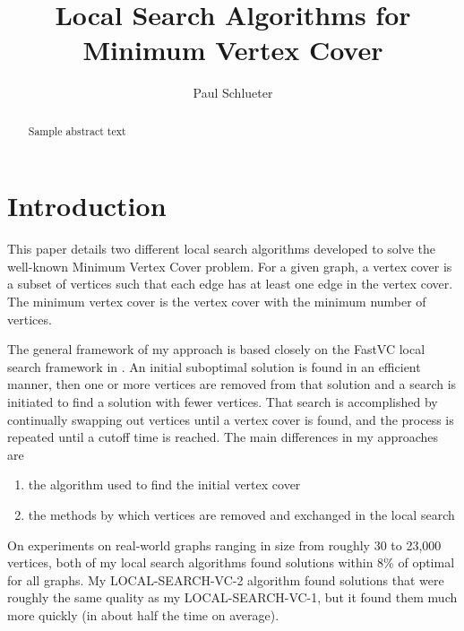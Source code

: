 \documentclass[sigconf]{acmart}
\begin{document}
\title{Local Search Algorithms for Minimum Vertex Cover}

\author{Paul Schlueter}

\begin{abstract}
Sample abstract text
\end{abstract}


\maketitle
 
\section{Introduction} \label{sec:intro}
This paper details two different local search algorithms developed to solve the well-known Minimum Vertex Cover problem. For a given graph, a vertex cover is a subset of vertices such that each edge has at least one edge in the vertex cover. The minimum vertex cover is the vertex cover with the minimum number of vertices. 

The general framework of my approach is based closely on the FastVC local search framework in \cite{cai2015fastvc}. An initial suboptimal solution is found in an efficient manner, then one or more vertices are removed from that solution and a search is initiated to find a solution with fewer vertices. That search is accomplished by continually swapping out vertices until a vertex cover is found, and the process is repeated until a cutoff time is reached. The main differences in my approaches are
\begin{enumerate}
	\item the algorithm used to find the initial vertex cover
	\item the methods by which vertices are removed and exchanged in the local search
\end{enumerate}

On experiments on real-world graphs ranging in size from roughly 30 to 23,000 vertices, both of my local search algorithms found solutions within 8\% of optimal for all graphs. My LOCAL-SEARCH-VC-2 algorithm found solutions that were roughly the same quality as my LOCAL-SEARCH-VC-1, but it found them much more quickly (in about half the time on average).
\end{document}
